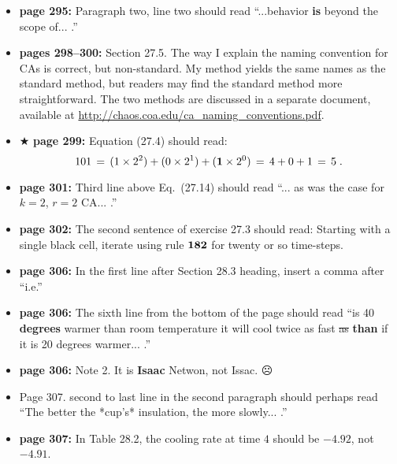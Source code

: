 \documentclass[12pt]{article}
\begin{document}
\begin{itemize}
  \item {\bf page 295:} Paragraph two, line two should read
    ``...behavior {\bf is} beyond the scope of... .''

  \item {\bf pages 298--300:}  Section 27.5.  The way I explain the
    naming convention for CAs is correct, but non-standard.  My method
    yields the same names as the standard method, but readers may find
    the standard method more straightforward.  The two methods are
    discussed in a separate document, available at
    \url{http://chaos.coa.edu/ca_naming_conventions.pdf}. 

  \item $\bigstar$ {\bf page 299:} Equation (27.4) should read:
\begin{equation}
  101 \, = \, (1 \times 2^2) + (0 \times 2^1) + ({\bf 1} \times 2^0)
  \, = \, 4 + 0 + 1 \, = \, 5 \;.
\end{equation}

  \item {\bf page 301:} Third line above Eq.~(27.14) should read
    ``... as was the case for $k=2$, {\bf $r=2$} CA... .''

  \item {\bf page 302:}  The second sentence of exercise 27.3 should
    read: Starting with a single black cell, iterate using rule {\bf
      ${\bf 182}$} for twenty or so time-steps.

  \item {\bf page 306:}  In the first line after Section 28.3 heading,
    insert a comma after ``i.e.''

  \item {\bf page 306:}  The sixth line from the bottom of the page
    should read ``is 40 {\bf degrees} warmer than room temperature it
    will cool twice as fast \sout{as} {\bf than} if it is 20 degrees
    warmer... .''

  \item {\bf page 306:}  Note 2.  It is {\bf Isaac} Netwon, not
    Issac.  $\frownie$

  \item Page 307.  second to last line in the second paragraph should
   perhaps read ``The better the *cup's* insulation, the more
   slowly... .''

  \item {\bf page 307:}  In Table 28.2, the cooling rate at time $4$
    should be $-4.92$, not $-4.91$.  


\end{itemize}
\end{document}
